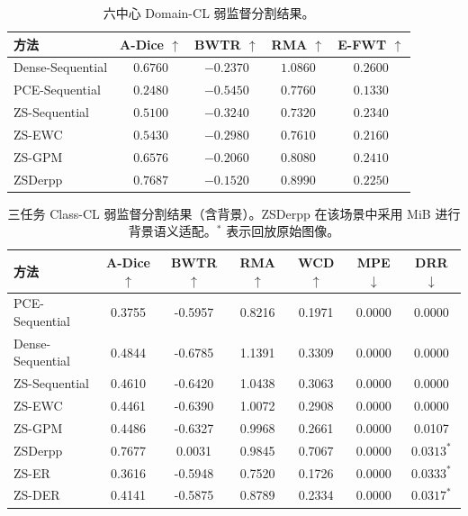 \begin{table}[htbp]
\centering
\setlength{\belowcaptionskip}{5pt}
\caption{六中心 Domain-CL 弱监督分割结果。}
\label{tab:scribblecl-domain-results}
\linespread{1}\selectfont
\thesistablefont
\renewcommand{\arraystretch}{1.14}
\setlength{\tabcolsep}{6pt}
\begin{tabular}{lcccc}
\toprule
方法 & A-Dice $\uparrow$ & BWTR $\uparrow$ & RMA $\uparrow$ & E-FWT $\uparrow$ \\
\midrule
Dense-Sequential & $0.6760$ & $-0.2370$ & $1.0860$ & $0.2600$ \\
PCE-Sequential & $0.2480$ & $-0.5450$ & $0.7760$ & $0.1330$ \\
ZS-Sequential & $0.5100$ & $-0.3240$ & $0.7320$ & $0.2340$ \\
ZS-EWC & $0.5430$ & $-0.2980$ & $0.7610$ & $0.2160$ \\
ZS-GPM & $0.6576$ & $-0.2060$ & $0.8080$ & $0.2410$ \\
ZSDerpp & $0.7687$ & $-0.1520$ & $0.8990$ & $0.2250$ \\
\bottomrule
\end{tabular}
\end{table}

\begin{table}[htbp]
\centering
\setlength{\belowcaptionskip}{5pt}
\caption{三任务 Class-CL 弱监督分割结果（含背景）。ZSDerpp 在该场景中采用 MiB 进行背景语义适配。$^{*}$ 表示回放原始图像。}
\label{tab:scribblecl-class-results}
\linespread{1}\selectfont
\thesistablefont
\renewcommand{\arraystretch}{1.14}
\setlength{\tabcolsep}{2pt}
\begin{tabular*}{\textwidth}{@{\extracolsep{\fill}}lcccccc@{}}
\toprule
方法 & A-Dice $\uparrow$ & BWTR $\uparrow$ & RMA $\uparrow$ & WCD $\uparrow$ & MPE $\downarrow$ & DRR $\downarrow$ \\
\midrule
PCE-Sequential & 0.3755 & -0.5957 & 0.8216 & 0.1971 & 0.0000 & 0.0000 \\
Dense-Sequential & 0.4844 & -0.6785 & 1.1391 & 0.3309 & 0.0000 & 0.0000 \\
ZS-Sequential & 0.4610 & -0.6420 & 1.0438 & 0.3063 & 0.0000 & 0.0000 \\
ZS-EWC & 0.4461 & -0.6390 & 1.0072 & 0.2908 & 0.0000 & 0.0000 \\
ZS-GPM & 0.4486 & -0.6327 & 0.9968 & 0.2661 & 0.0000 & 0.0107 \\
ZSDerpp & 0.7677 & 0.0031 & 0.9845 & 0.7067 & 0.0000 & $0.0313^{*}$ \\
ZS-ER & 0.3616 & -0.5948 & 0.7520 & 0.1726 & 0.0000 & $0.0333^{*}$ \\
ZS-DER & 0.4141 & -0.5875 & 0.8789 & 0.2334 & 0.0000 & $0.0317^{*}$ \\
\bottomrule
\end{tabular*}
\end{table}

